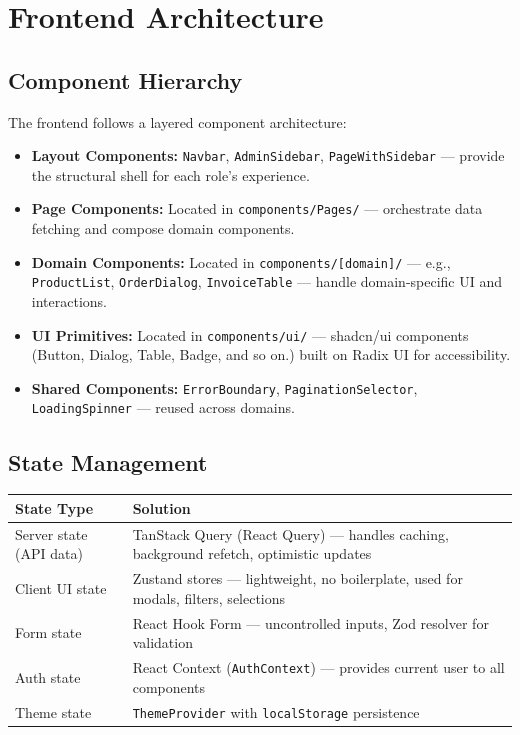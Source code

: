﻿\documentclass[12pt,a4paper]{report}
\begin{document}
\section{Frontend Architecture}

\subsection{Component Hierarchy}

The frontend follows a layered component architecture:

\begin{itemize}[leftmargin=1.5em]
  \item \textbf{Layout Components:} \texttt{Navbar}, \texttt{AdminSidebar}, \texttt{PageWithSidebar} --- provide the structural shell for each role's experience.
  \item \textbf{Page Components:} Located in \texttt{components/Pages/} --- orchestrate data fetching and compose domain components.
  \item \textbf{Domain Components:} Located in \texttt{components/[domain]/} --- e.g., \texttt{ProductList}, \texttt{OrderDialog}, \texttt{InvoiceTable} --- handle domain-specific UI and interactions.
  \item \textbf{UI Primitives:} Located in \texttt{components/ui/} --- shadcn/ui components (Button, Dialog, Table, Badge, and so on.) built on Radix UI for accessibility.
  \item \textbf{Shared Components:} \texttt{ErrorBoundary}, \texttt{PaginationSelector}, \texttt{LoadingSpinner} --- reused across domains.
\end{itemize}

\subsection{State Management}

\begin{center}
\begin{tabularx}{\textwidth}{lX}
  \toprule
  \textbf{State Type} & \textbf{Solution} \\
  \midrule
  Server state (API data) & TanStack Query (React Query) --- handles caching, background refetch, optimistic updates \\
  Client UI state         & Zustand stores --- lightweight, no boilerplate, used for modals, filters, selections \\
  Form state              & React Hook Form --- uncontrolled inputs, Zod resolver for validation \\
  Auth state              & React Context (\texttt{AuthContext}) --- provides current user to all components \\
  Theme state             & \texttt{ThemeProvider} with \texttt{localStorage} persistence \\
  \bottomrule
\end{tabularx}
\end{center}
\end{document}

